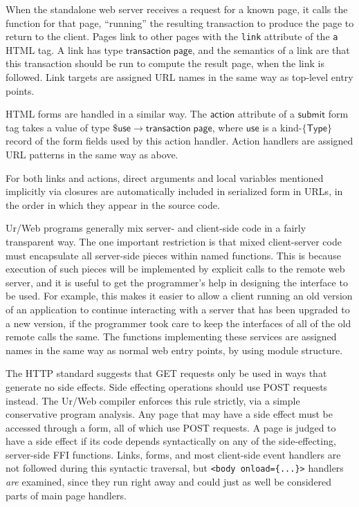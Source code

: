 \documentclass{article}
\newcommand{\mt}[1]{\mathsf{#1}}
\begin{document}
When the standalone web server receives a request for a known page, it calls the function for that page, ``running'' the resulting transaction to produce the page to return to the client.  Pages link to other pages with the \texttt{link} attribute of the \texttt{a} HTML tag.  A link has type $\mt{transaction} \; \mt{page}$, and the semantics of a link are that this transaction should be run to compute the result page, when the link is followed.  Link targets are assigned URL names in the same way as top-level entry points.

HTML forms are handled in a similar way.  The $\mt{action}$ attribute of a $\mt{submit}$ form tag takes a value of type $\$\mt{use} \to \mt{transaction} \; \mt{page}$, where $\mt{use}$ is a kind-$\{\mt{Type}\}$ record of the form fields used by this action handler.  Action handlers are assigned URL patterns in the same way as above.

For both links and actions, direct arguments and local variables mentioned implicitly via closures are automatically included in serialized form in URLs, in the order in which they appear in the source code.

Ur/Web programs generally mix server- and client-side code in a fairly transparent way.  The one important restriction is that mixed client-server code must encapsulate all server-side pieces within named functions.  This is because execution of such pieces will be implemented by explicit calls to the remote web server, and it is useful to get the programmer's help in designing the interface to be used.  For example, this makes it easier to allow a client running an old version of an application to continue interacting with a server that has been upgraded to a new version, if the programmer took care to keep the interfaces of all of the old remote calls the same.  The functions implementing these services are assigned names in the same way as normal web entry points, by using module structure.

\medskip

The HTTP standard suggests that GET requests only be used in ways that generate no side effects.  Side effecting operations should use POST requests instead.  The Ur/Web compiler enforces this rule strictly, via a simple conservative program analysis.  Any page that may have a side effect must be accessed through a form, all of which use POST requests.  A page is judged to have a side effect if its code depends syntactically on any of the side-effecting, server-side FFI functions.  Links, forms, and most client-side event handlers are not followed during this syntactic traversal, but \texttt{<body onload=\{...\}>} handlers \emph{are} examined, since they run right away and could just as well be considered parts of main page handlers.
\end{document}
